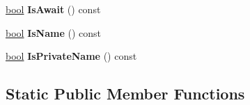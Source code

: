 \begin{DoxyCompactItemize}
\mbox{\hyperlink{classbool}{bool}} {\bfseries Is\+Await} () const
\item 
\mbox{\label{classv8_1_1internal_1_1PreParserIdentifier_a307c3a2ffbeb9e2b8253befffb240631}} 
\mbox{\hyperlink{classbool}{bool}} {\bfseries Is\+Name} () const
\item 
\mbox{\label{classv8_1_1internal_1_1PreParserIdentifier_a33287f9e70495ac9b1379f1ed5105068}} 
\mbox{\hyperlink{classbool}{bool}} {\bfseries Is\+Private\+Name} () const
\end{DoxyCompactItemize}
\subsection*{Static Public Member Functions}
